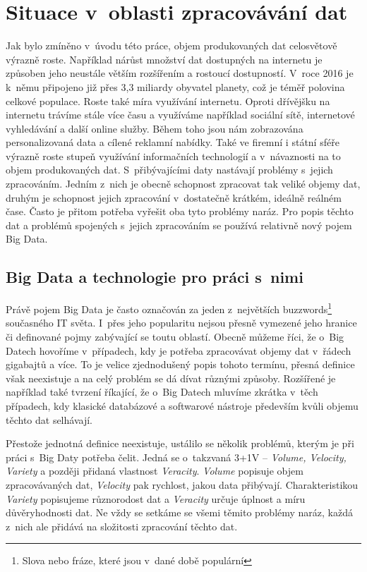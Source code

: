\documentclass[thesis=B,czech]{FITthesis}[2012/06/26]
\begin{document}
\chapter{Situace v~oblasti zpracovávání dat}
\label{data-processing}
	Jak bylo zmíněno v~úvodu této práce, objem produkovaných dat celosvětově výrazně roste. Například nárůst množství dat dostupných na internetu je způsoben jeho neustále větším rozšířením a rostoucí dostupností. V~roce 2016 je k~němu připojeno již přes 3,3 miliardy obyvatel planety\cite{internet-live-stats}, což je téměř polovina celkové populace. Roste také míra využívání internetu. Oproti dřívějšku na internetu trávíme stále více času a využíváme například sociální sítě, internetové vyhledávání a další online služby. Během toho jsou nám zobrazována personalizovaná data a cílené reklamní nabídky. Také ve firemní i státní sféře výrazně roste stupeň využívání informačních technologií a v~návaznosti na to objem produkovaných dat. S~přibývajícími daty nastávají problémy s~jejich zpracováním. Jedním z~nich je obecně schopnost zpracovat tak veliké objemy dat, druhým je schopnost jejich zpracování v~dostatečně krátkém, ideálně reálném čase. Často je přitom potřeba vyřešit oba tyto problémy naráz. Pro popis těchto dat a problémů spojených s~jejich zpracováním se používá relativně nový pojem Big Data. 

		 
\section{Big Data a technologie pro práci s~nimi}
	Právě pojem Big Data je často označován za jeden z~největších buzzwords\footnote{Slova nebo fráze, které jsou v~dané době populární} současného IT světa. I~přes jeho popularitu nejsou přesně vymezené jeho hranice či definované pojmy zabývající se toutu oblastí. Obecně můžeme říci, že o~Big Datech hovoříme v~případech, kdy je potřeba zpracovávat objemy dat v~řádech gigabajtů a více. To je velice zjednodušený popis tohoto termínu, přesná definice však neexistuje a na celý problém se dá dívat různými způsoby. Rozšířené je například také tvrzení říkající, že o~Big Datech mluvíme zkrátka v~těch případech, kdy klasické databázové a softwarové nástroje především kvůli objemu těchto dat selhávají\cite{webopedia-bigdata}. 

	Přestože jednotná definice neexistuje, ustálilo se několik problémů, kterým je při práci s~Big Daty potřeba čelit. Jedná se o~takzvaná 3+1V -- \textit{Volume, Velocity, Variety} a později přidaná vlastnost \textit{Veracity}\cite{dp-customer-inteligence}. \textit{Volume} popisuje objem zpracovávaných dat, \textit{Velocity} pak rychlost, jakou data přibývají. Charakteristikou \textit{Variety} popisujeme různorodost dat a \textit{Veracity} určuje úplnost a míru důvěryhodnosti dat. Ne vždy se setkáme se všemi těmito problémy naráz, každá z~nich ale přidává na složitosti zpracování těchto dat. 
	
\end{document}
